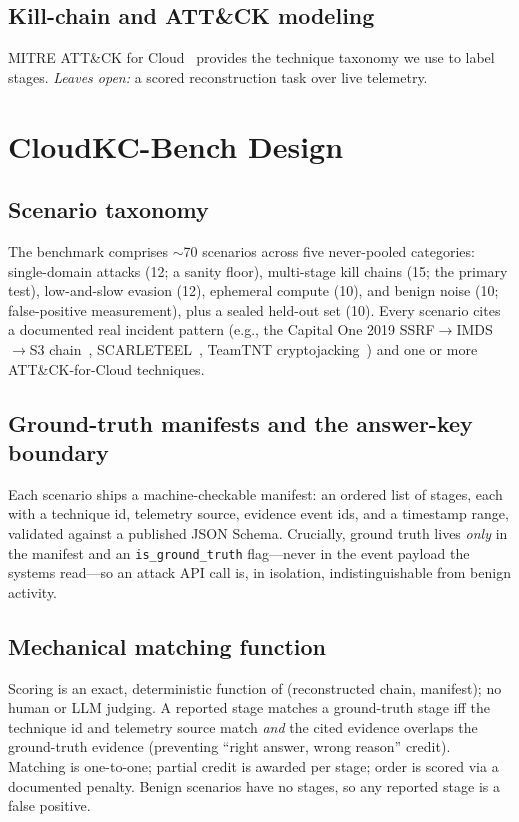 \documentclass[journal]{IEEEtran}
\begin{document}
\subsection{Kill-chain and ATT\&CK modeling}
MITRE ATT\&CK for Cloud~\cite{mitreattack} provides the technique taxonomy we use to
label stages. \emph{Leaves open:} a scored reconstruction task over live telemetry.

\section{CloudKC-Bench Design}\label{sec:bench}
\subsection{Scenario taxonomy}
The benchmark comprises $\sim$70 scenarios across five never-pooled categories:
single-domain attacks (12; a sanity floor), multi-stage kill chains (15; the primary
test), low-and-slow evasion (12), ephemeral compute (10), and benign noise (10;
false-positive measurement), plus a sealed held-out set (10). Every scenario cites a
documented real incident pattern (e.g., the Capital One 2019 SSRF$\rightarrow$IMDS
$\rightarrow$S3 chain~\cite{capitalone2019}, SCARLETEEL~\cite{scarleteel2023}, TeamTNT
cryptojacking~\cite{teamtnt2020}) and one or more ATT\&CK-for-Cloud techniques.

\subsection{Ground-truth manifests and the answer-key boundary}
Each scenario ships a machine-checkable manifest: an ordered list of stages, each with a
technique id, telemetry source, evidence event ids, and a timestamp range, validated
against a published JSON Schema. Crucially, ground truth lives \emph{only} in the
manifest and an \texttt{is\_ground\_truth} flag---never in the event payload the systems
read---so an attack API call is, in isolation, indistinguishable from benign activity.

\subsection{Mechanical matching function}
Scoring is an exact, deterministic function of (reconstructed chain, manifest); no human
or LLM judging. A reported stage matches a ground-truth stage iff the technique id and
telemetry source match \emph{and} the cited evidence overlaps the ground-truth evidence
(preventing ``right answer, wrong reason'' credit). Matching is one-to-one; partial credit
is awarded per stage; order is scored via a documented penalty. Benign scenarios have no
stages, so any reported stage is a false positive.
\end{document}

